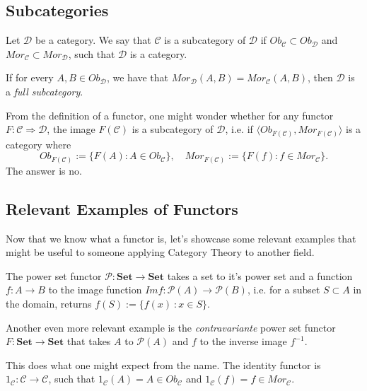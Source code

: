 \subsection{Subcategories}

\begin{definition}[Subcategory]
  Let $\mathcal D$ be a category. We say that $\mathcal C$
  is a subcategory of $\mathcal D$ if $Ob_\mathcal C \subset Ob_\mathcal D$ and
  $Mor_\mathcal C \subset Mor_\mathcal D$, such that $\mathcal D$ is a category.

  If for every $A, B \in Ob_\mathcal D$, we have that $Mor_\mathcal D (A,B) = Mor_\mathcal C(A,B)$,
  then $\mathcal D$ is a \textit{full subcategory}.
\end{definition}

From the definition of a functor, one might wonder whether for any
functor $F:\mathcal C \Rightarrow \mathcal D$,
the image $F(\mathcal C)$ is a subcategory of $\mathcal D$, i.e.
if $\langle Ob_{F(\mathcal C)}, Mor_{F(\mathcal C)} \rangle$ is a category where
\begin{displaymath}
  Ob_{F(\mathcal C)}:= \{F(A) : A \in Ob_\mathcal C\}, \quad
  Mor_{F(\mathcal C)}:= \{F(f) : f \in Mor_\mathcal C\}.
\end{displaymath}
The answer is no.

\subsection{Relevant Examples of Functors}

Now that we know what a functor is, let's showcase some relevant examples
that might be useful to someone applying Category Theory to another field.

\begin{example}
  The power set functor $\mathcal P : \mathbf{Set} \to \mathbf{Set}$ takes a
  set to it's power set and a function $f:A\to B$ to the image function
  $Im f : \mathcal P(A) \to \mathcal P(B)$, i.e. for a subset $S \subset A$
  in the domain, returns $f(S) := \{ f(x) \ : x \in S\}$.

  Another even more relevant example is the \textit{contravariante} power set
  functor $F : \mathbf{Set} \to \mathbf{Set}$ that takes $A$ to $\mathcal P(A)$
  and $f$ to the inverse image $f^{-1}$.
\end{example}

\begin{example}
  This does what one might expect from the name. The identity
  functor is $1_\mathcal C : \mathcal C \to \mathcal C$, such that
  $1_\mathcal C (A) = A \in Ob_\mathcal C$ and
  $1_\mathcal C (f) = f \in Mor_\mathcal C$.
\end{example}

